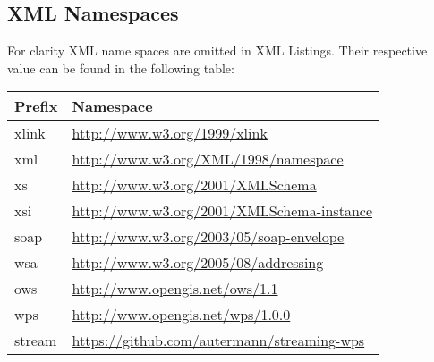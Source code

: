 \documentclass[english,
               paper=a4,
               fontsize=11pt,
               bibliography=totoc,
               listof=nochaptergap,
               listof=notoc,
               numbers=noendperiod,
               parskip=half,
               footnotes=multiple,
               toc=numberline,
               captions=tableheading,
               DIV=10,
              ]{scrreprt}
\begin{document}
\begin{appendix}
    \chapter{XML Namespaces}\label{sec:xmlnamespaces}
      For clarity XML name spaces are omitted in XML Listings. Their respective value can be found in the following table:
      \begin{center}
        \begin{small}
          \begin{tabular}{@{}ll@{}}
            \toprule
            \textbf{Prefix} & \textbf{Namespace} \\
            \midrule
            xlink  & \url{http://www.w3.org/1999/xlink}\\
            xml    & \url{http://www.w3.org/XML/1998/namespace}\\
            xs     & \url{http://www.w3.org/2001/XMLSchema}\\
            xsi    & \url{http://www.w3.org/2001/XMLSchema-instance}\\
            soap   & \url{http://www.w3.org/2003/05/soap-envelope}\\
            wsa    & \url{http://www.w3.org/2005/08/addressing}\\
            ows    & \url{http://www.opengis.net/ows/1.1}\\
            wps    & \url{http://www.opengis.net/wps/1.0.0}\\
            stream & \url{https://github.com/autermann/streaming-wps} \\
            \bottomrule
          \end{tabular}
        \end{small}
      \end{center}
  \end{appendix}

\end{document}
